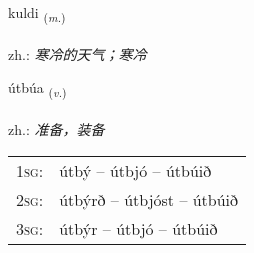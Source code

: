 \documentclass[frontgrid, backgrid]{flacards}\usepackage[]{graphicx}\usepackage[]{xcolor}
\begin{document}
\renewcommand{\blhead}{\vskip5pt {\small\bfseries\footnotesize Nafnorð | 名词 }}
\renewcommand{\bcfoot}{\vskip5pt \hspace{2pt}{\small\bfseries\footnotesize 3K}}


{kuldi \small{\textsubscript{(\textit{m.})}} \\[1ex] %
\textphonetic{[kʰʏltɪ]} \\
zh.: \emph{寒冷的天气；寒冷} \\  [2ex]
\renewcommand*{\arraystretch}{0.8}
}

\renewcommand{\flhead}{\vskip5pt \fboxsep=0pt {\small\bfseries\footnotesize Sagnorð | 动词}}
\renewcommand{\fcfoot}{\vskip5pt \fboxsep=0pt \hspace{2pt}{\small\bfseries\footnotesize 3K}}

\renewcommand{\blhead}{\vskip5pt {\small\bfseries\footnotesize Sagnorð | 动词 }}
\renewcommand{\bcfoot}{\vskip5pt \hspace{2pt}{\small\bfseries\footnotesize 3K}}


{útbúa \small{\textsubscript{(\textit{v.})}} \\[1ex] %
\textphonetic{[uːtpua]} \\
zh.: \emph{准备，装备} \\  [2ex]
\renewcommand*{\arraystretch}{0.8}
\begin{tabular}{p{1cm}l}
\textsc{1sg}: & útbý -- útbjó -- útbúið \\ 
\textsc{2sg}: & útbýrð -- útbjóst -- útbúið \\ 
\textsc{3sg}: & útbýr -- útbjó -- útbúið \\ 
\end{tabular}
}

\renewcommand{\flhead}{\vskip5pt \fboxsep=0pt {\small\bfseries\footnotesize Nafnorð | 名词}}
\renewcommand{\fcfoot}{\vskip5pt \fboxsep=0pt \hspace{2pt}{\small\bfseries\footnotesize 3K}}
\end{document}
